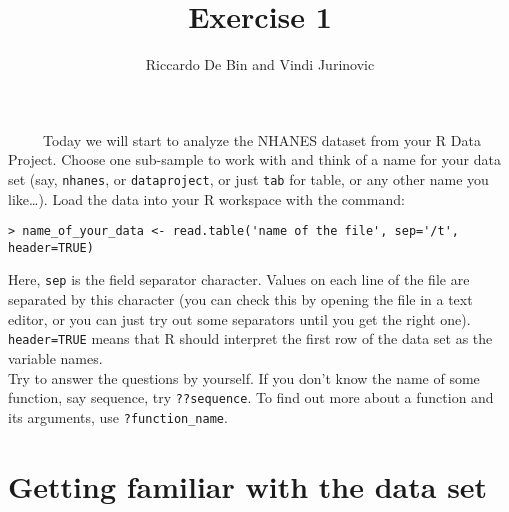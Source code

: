 \documentclass[]{article}
\title{Exercise 1}
\author{Riccardo De Bin and Vindi Jurinovic}
\date{}
\begin{document}
\maketitle


~~~~~Today we will start to analyze the NHANES dataset from your R Data
Project. Choose one sub-sample to work with and think of a name for your
data set (say, \texttt{nhanes}, or \texttt{dataproject}, or just
\texttt{tab} for table, or any other name you like\ldots{}). Load the
data into your R workspace with the command:

\begin{verbatim}
> name_of_your_data <- read.table('name of the file', sep='/t', header=TRUE)
\end{verbatim}

Here, \texttt{sep} is the field separator character. Values on each line
of the file are separated by this character (you can check this by
opening the file in a text editor, or you can just try out some
separators until you get the right one). \texttt{header=TRUE} means that
R should interpret the first row of the data set as the variable
names.\\

Try to answer the questions by yourself. If you don't know the name of
some function, say sequence, try \texttt{??sequence}. To find out more
about a function and its arguments, use \texttt{?function\_name}.\\

\section{Getting familiar with the data
set}\label{getting-familiar-with-the-data-set}
\end{document}

